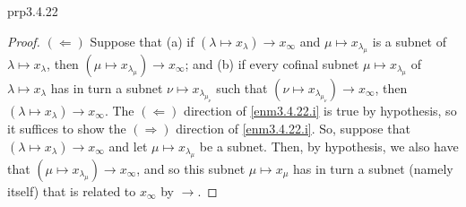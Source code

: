 \begin{prp}{}{prp3.4.22}
\begin{proof}
\blankline
\noindent
$(\Leftarrow )$ Suppose that (a) if $(\lambda \mapsto x_\lambda )\to x_\infty$ and $\mu \mapsto x_{\lambda _\mu}$ is a subnet of $\lambda \mapsto x_\lambda$, then $(\mu \mapsto x_{\lambda _\mu})\to x_\infty$; and (b) if every cofinal subnet $\mu \mapsto x_{\lambda _\mu}$ of $\lambda \mapsto x_{\lambda}$ has in turn a subnet $\nu \mapsto x_{\lambda _{\mu _\nu}}$ such that $(\nu \mapsto x_{\lambda _{\mu _\nu}})\to x_\infty$, then $(\lambda \mapsto x_\lambda )\to x_\infty$.  The $(\Leftarrow )$ direction of \cref{enm3.4.22.i} is true by hypothesis, so it suffices to show the $(\Rightarrow )$ direction of \cref{enm3.4.22.i}.  So, suppose that $(\lambda \mapsto x_\lambda )\to x_\infty$ and let $\mu \mapsto x_{\lambda _\mu}$ be a subnet.  Then, by hypothesis, we also have that $(\mu \mapsto x_{\lambda _\mu})\to x_\infty$, and so this subnet $\mu \mapsto x_\mu$ has in turn a subnet (namely itself) that is related to $x_\infty$ by $\to$.
\end{proof}
\end{prp}

